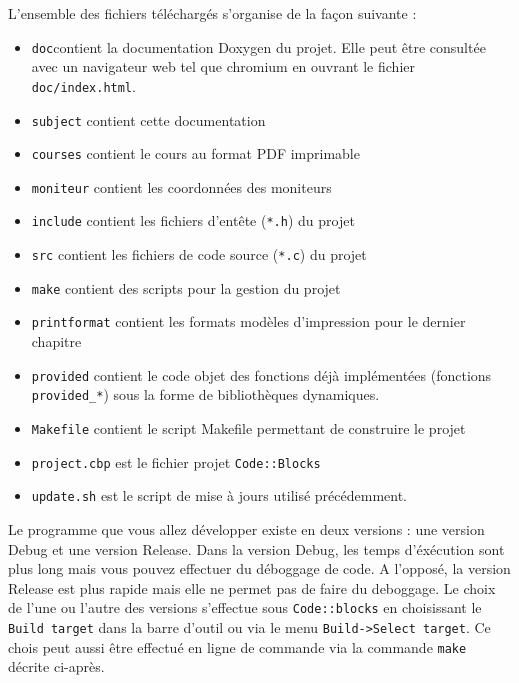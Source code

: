L'ensemble des fichiers téléchargés s'organise de la façon suivante :
\begin{itemize}
  \item \verb-doc-contient la documentation Doxygen du projet. Elle peut être consultée avec un navigateur web tel que chromium en ouvrant le fichier \verb-doc/index.html-.
  \item \verb-subject- contient cette documentation
  \item \verb-courses- contient le cours au format PDF imprimable
  \item \verb-moniteur- contient les coordonnées des moniteurs
  \item \verb-include- contient les fichiers d'entête (\verb-*.h-) du projet
  \item \verb-src- contient les fichiers de code source (\verb-*.c-) du projet
  \item \verb-make- contient des scripts pour la gestion du projet
  \item \verb-printformat- contient les formats modèles d'impression pour le dernier chapitre
  \item \verb-provided- contient le code objet des fonctions déjà implémentées (fonctions \verb-provided_*-) sous la forme de bibliothèques dynamiques.
  \item \verb-Makefile- contient le script Makefile permettant de construire le projet
  \item \verb-project.cbp- est le fichier projet \verb-Code::Blocks-
  \item \verb-update.sh- est le script de mise à jours utilisé précédemment.
\end{itemize}

Le programme que vous allez développer existe en deux versions : une version Debug et une version Release. Dans la version Debug, les temps d'éxécution sont plus long mais vous pouvez effectuer du déboggage de code. A l'opposé, la version Release est plus rapide mais elle ne permet pas de faire du deboggage. Le choix de l'une ou l'autre des versions s'effectue sous \verb-Code::blocks- en choisissant le \verb-Build target- dans la barre d'outil ou via le menu \verb'Build->Select target'. Ce chois peut aussi être effectué en ligne de commande via la commande \verb-make- décrite ci-après.

\begin{center}
\end{center}

